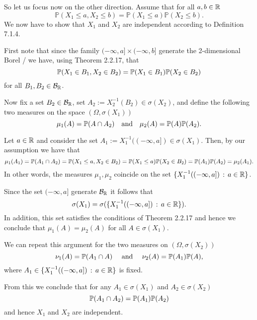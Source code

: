 \documentclass{lecturenotes}
\begin{document}
So let us focus now on the other direction. Assume that for all $a,b \in \mathbb R$
\[
	\mathbb{P}(X_1 \le a, X_2 \le b) = \mathbb{P}(X_1 \le a) \mathbb{P}(X_2 \le b).
\]
We now have to show that $X_1$ and $X_2$ are independent according to Definition 7.1.4.

First note that since the family $(-\infty, a] \times (-\infty ,b]$ generate the 2-dimensional Borel \sigalg/ we have, using Theorem 2.2.17, that
\[
	\mathbb P(X_1 \in B_1, X_2 \in B_2) = \mathbb P(X_1 \in B_1) \mathbb P(X_2 \in B_2)
\]
for all $B_1, B_2 \in \mathcal B_{\mathbb R}$.

Now fix a set $B_2 \in \mathcal B_{\mathbb R}$, set $A_2 := X_2^{-1}(B_2) \in \sigma(X_2)$, and define the following two measures on the space $(\Omega, \sigma(X_1))$
\[
	\mu_1(A) = \mathbb P(A \cap A_2) \quad \text{and} \quad \mu_2(A) = \mathbb P(A)\mathbb P(A_2).
\]  

Let $a \in \mathbb R$ and consider the set $A_1 := X_1^{-1}((-\infty ,a]) \in \sigma(X_1)$. Then, by our assumption we have that
\[
	\mu_1(A_1) = \mathbb P(A_1 \cap A_2) = \mathbb P(X_1 \le a, X_2 \in B_2) = \mathbb P(X_1 \le a) \mathbb P(X_2 \in B_2) = \mathbb P(A_1) \mathbb P(A_2)
	= \mu_2(A_1).
\]
In other words, the measures $\mu_1, \mu_2$ coincide on the set $\{X_1^{-1}((-\infty, a]) \, : \, a \in \mathbb R\}$.

Since the set $(-\infty,a]$ generate $\mathcal B_{\mathbb R}$ it follows that 
\[
	\sigma(X_1) = \sigma(\{X_1^{-1}((-\infty, a]) \, : \, a \in \mathbb R\}).
\]
In addition, this set satisfies the conditions of Theorem 2.2.17 and hence we conclude that $\mu_1(A) = \mu_2(A)$ for all $A \in \sigma(X_1)$.

We can repeat this argument for the two measures on $(\Omega, \sigma(X_2))$
\[
	\nu_1(A) = \mathbb P(A_1 \cap A) \quad \text{ and } \quad \nu_2(A) = \mathbb P(A_1) \mathbb P(A), 
\]
where $A_1 \in \{X_1^{-1}((-\infty, a]) \, : \, a \in \mathbb R\}$ is fixed. 

From this we conclude that for any $A_1 \in \sigma(X_1)$ and $A_2 \in \sigma(X_2)$
\[
	\mathbb P(A_1 \cap A_2) = \mathbb P(A_1)\mathbb P(A_2)
\]
and hence $X_1$ and $X_2$ are independent.

%
%
\end{document}
